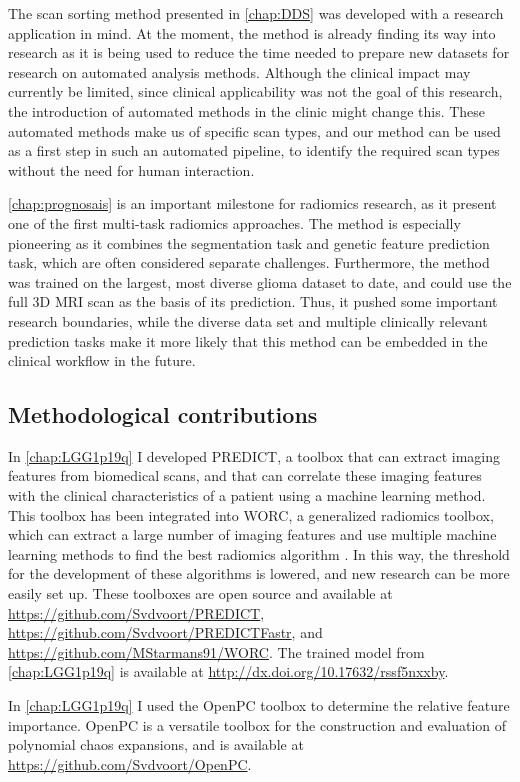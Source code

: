 The scan sorting method presented in \cref{chap:DDS} was developed with a research application in mind.
At the moment, the method is already finding its way into research as it is being used to reduce the time needed to prepare new datasets for research on automated analysis methods.
Although the clinical impact may currently be limited, since clinical applicability was not the goal of this research, the introduction of automated methods in the clinic might change this.
These automated methods make us of specific scan types, and our method can be used as a first step in such an automated pipeline, to identify the required scan types without the need for human interaction.

\cref{chap:prognosais} is an important milestone for radiomics research, as it present one of the first multi-task radiomics approaches.
The method is especially pioneering as it combines the segmentation task and genetic feature prediction task, which are often considered separate challenges.
Furthermore, the method was trained on the largest, most diverse glioma dataset to date, and could use the full 3D \gls{MRI} scan as the basis of its prediction.
Thus, it pushed some important research boundaries, while the diverse data set and multiple clinically relevant prediction tasks make it more likely that this method can be embedded in the clinical workflow in the future.


\subsection{Methodological contributions}
In \cref{chap:LGG1p19q} I developed PREDICT, a toolbox that can extract imaging features from biomedical scans, and that can correlate these imaging features with the clinical characteristics of a patient using a machine learning method.
This toolbox has been integrated into WORC, a generalized radiomics toolbox, which can extract a large number of imaging features and use multiple machine learning methods to find the best radiomics algorithm \autocite{mstarmans2020worc}.
In this way, the threshold for the development of these algorithms is lowered, and new research can be more easily set up.
These toolboxes are open source and available at \url{https://github.com/Svdvoort/PREDICT}, \url{https://github.com/Svdvoort/PREDICTFastr}, and \url{https://github.com/MStarmans91/WORC}.
The trained model from \cref{chap:LGG1p19q} is available at \url{http://dx.doi.org/10.17632/rssf5nxxby}.

In \cref{chap:LGG1p19q} I used the OpenPC toolbox to determine the relative feature importance.
OpenPC is a versatile toolbox for the construction and evaluation of polynomial chaos expansions, and is available at \url{https://github.com/Svdvoort/OpenPC}.

